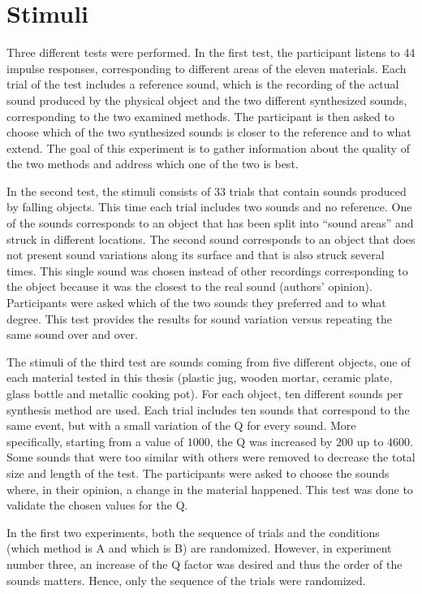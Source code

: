 \section{Stimuli}
Three different tests were performed. In the first test, the participant listens to 44 impulse responses, corresponding to different areas of the eleven materials. Each trial of the test includes a reference sound, which is the recording of the actual sound produced by the physical object and the two different synthesized sounds, corresponding to the two examined methods. The participant is then asked to choose which of the two synthesized sounds is closer to the reference and to what extend. The goal of this experiment is to gather information about the quality of the two methods and address which one of the two is best.

In the second test, the stimuli consists of 33 trials that contain sounds produced by falling objects. This time each trial includes two sounds and no reference. One of the sounds corresponds to an object that has been split into ``sound areas'' and struck in different locations. The second sound corresponds to an object that does not present sound variations along its surface and that is also struck several times. This single sound was chosen instead of other recordings corresponding to the object because it was the closest to the real sound (authors' opinion). Participants were asked which of the two sounds they preferred and to what degree. This test provides the results for sound variation versus repeating the same sound over and over.

The stimuli of the third test are sounds coming from five different objects, one of each material tested in this thesis (plastic jug, wooden mortar, ceramic plate, glass bottle and metallic cooking pot). For each object, ten different sounds per synthesis method are used. Each trial includes ten sounds that correspond to the same event, but with a small variation of the \gls{Q} for every sound. More specifically, starting from a value of $1000$, the \gls{Q} was increased by $200$ up to $4600$. Some sounds that were too similar with others were removed to decrease the total size and length of the test. The participants were asked to choose the sounds where, in their opinion, a change in the material happened. This test was done to validate the chosen values for the \gls{Q}.

In the first two experiments, both the sequence of trials and the conditions (which method is A and which is B) are randomized. However, in experiment number three, an increase of the \gls{Q} factor was desired and thus the order of the sounds matters. Hence, only the sequence of the trials were randomized.

